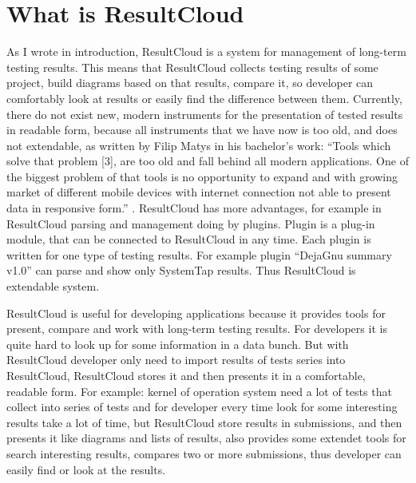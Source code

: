 
\section{What is ResultCloud}

As I wrote in introduction, ResultCloud is a system for management of long-term testing results. This means that ResultCloud collects testing results of some project, build diagrams based on that results, compare it, so developer can comfortably look at results or easily find the difference between them. Currently, there do not exist new, modern instruments for the presentation of tested results in readable form, because all instruments that we have now is too old, and does not extendable, as written by Filip Matys in his bachelor's work: “Tools which solve that problem [3], are too old and fall behind all modern applications. One of the biggest problem of that tools is no opportunity to expand and with growing market of different mobile devices with internet connection not able to present data in responsive form.” \cite{filip}. ResultCloud has more advantages, for example in ResultCloud parsing and management doing by plugins. Plugin is a plug-in module, that can be connected to ResultCloud in any time. Each plugin is written for one type of testing results. For example plugin “DejaGnu summary v1.0” can parse and show only SystemTap results. Thus ResultCloud is extendable system.

ResultCloud is useful for developing applications because it provides tools for present, compare and work with long-term testing results. For developers it is quite hard to look up for some information in a data bunch. But with ResultCloud developer only need to import results of tests series into ResultCloud, ResultCloud stores it and then presents it in a comfortable, readable form. For example: kernel of operation system need a lot of tests that collect into series of tests and for developer every time look for some interesting results take a lot of time, but ResultCloud store results in submissions, and then presents it like diagrams and lists of results, also provides some extendet tools for search interesting results, compares two or more submissions, thus developer can easily find or look at the results.

